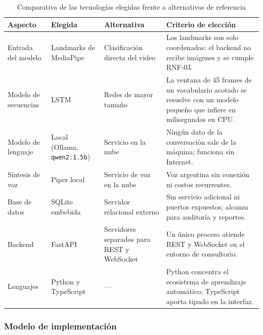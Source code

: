 \begin{table}[H]
  \centering
  \caption{Comparativa de las tecnologías elegidas frente a alternativas de referencia}\label{tab:comparativa}
  \small
  \begin{tabularx}{\textwidth}{>{\raggedright\arraybackslash}p{2.7cm} >{\raggedright\arraybackslash}p{3.3cm} >{\raggedright\arraybackslash}p{3.3cm} X}
    \toprule
    \textbf{Aspecto} & \textbf{Elegida} & \textbf{Alternativa} & \textbf{Criterio de elección} \\
    \midrule
    Entrada del modelo & Landmarks de MediaPipe & Clasificación directa del video & Los landmarks son solo coordenadas: el backend no recibe imágenes y se cumple RNF-03. \\
    Modelo de secuencias & LSTM & Redes de mayor tamaño & La ventana de 45 frames de un vocabulario acotado se resuelve con un modelo pequeño que infiere en milisegundos en CPU. \\
    Modelo de lenguaje & Local (Ollama, \texttt{qwen2:1.5b}) & Servicio en la nube & Ningún dato de la conversación sale de la máquina; funciona sin Internet. \\
    Síntesis de voz & Piper local & Servicio de voz en la nube & Voz argentina sin conexión ni costos recurrentes. \\
    Base de datos & SQLite embebida & Servidor relacional externo & Sin servicio adicional ni puertos expuestos; alcanza para auditoría y reportes. \\
    Backend & FastAPI & Servidores separados para REST y WebSocket & Un único proceso atiende REST y WebSocket en el entorno de consultorio. \\
    Lenguajes & Python y TypeScript & --- & Python concentra el ecosistema de aprendizaje automático; TypeScript aporta tipado en la interfaz. \\
    \bottomrule
  \end{tabularx}
\end{table}

\subsubsection{Modelo de implementación}

